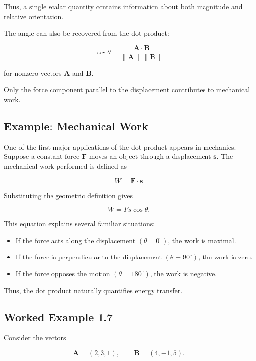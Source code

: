 Thus, a single scalar quantity contains information about both magnitude and
relative orientation.

The angle can also be recovered from the dot product:

\[
\boxed{
\cos\theta
=
\frac{\mathbf A\cdot\mathbf B}
{\lVert\mathbf A\rVert\,\lVert\mathbf B\rVert}
}
\]

for nonzero vectors $\mathbf A$ and $\mathbf B$.

\begin{bookfigure}{Only the force component parallel to the displacement contributes to mechanical work.}

\label{fig:work-dot-product}
\end{bookfigure}

\subsection{Example: Mechanical Work}

One of the first major applications of the dot product appears in mechanics.
Suppose a constant force $\mathbf F$ moves an object through a displacement
$\mathbf s$. The mechanical work performed is defined as

\[
\boxed{
W=\mathbf F\cdot\mathbf s
}
\]

Substituting the geometric definition gives

\[
W=Fs\cos\theta.
\]

This equation explains several familiar situations:

\begin{itemize}
  \item If the force acts along the displacement $(\theta=0^{\circ})$, the work
  is maximal.
  \item If the force is perpendicular to the displacement
  $(\theta=90^{\circ})$, the work is zero.
  \item If the force opposes the motion $(\theta=180^{\circ})$, the work is
  negative.
\end{itemize}

Thus, the dot product naturally quantifies energy transfer.

\subsection{Worked Example 1.7}

Consider the vectors

\[
\mathbf A=(2,3,1),
\qquad
\mathbf B=(4,-1,5).
\]

